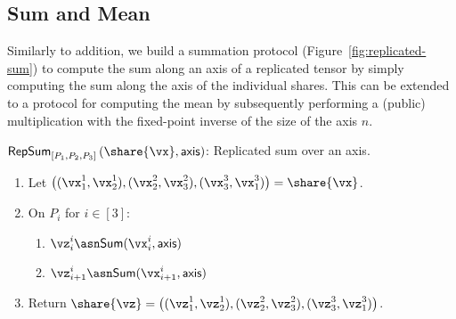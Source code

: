 \subsection{Sum and Mean}

Similarly to addition, we build a summation protocol (Figure~\ref{fig:replicated-sum}) to compute the sum along an axis of a replicated tensor by simply computing the sum along the axis of the individual shares. This can be extended to a protocol for computing the mean by subsequently performing a (public) multiplication with the fixed-point inverse of the size of the axis $n$.


\msubsubsection
{$\mathsf{RepSum}_{[P_1, P_2, P_3]}\left(\share{\vx}, \mathsf{axis} \right)$:}
\label{fig:replicated-sum}
  Replicated sum over an axis.

  \begin{enumerate}
  \item Let $\left( (\vx_1^1, \vx_2^1), (\vx_2^2, \vx_3^2), (\vx_3^3, \vx_1^3) \right) = \share{\vx}$.

  \item On $P_i$ for $i \in [3]$:
  \begin{enumerate}
    \item $\vz_i^i \asn \mathsf{Sum}(\vx_i^i, \mathsf{axis})$
    \item $\vz_{i+1}^i \asn \mathsf{Sum}(\vx_{i+1}^i, \mathsf{axis})$
  \end{enumerate}

  \item Return $\share{\vz} = \left( (\vz_1^1, \vz_2^1), (\vz_2^2, \vz_3^2), (\vz_3^3, \vz_1^3) \right)$.
  \end{enumerate}
